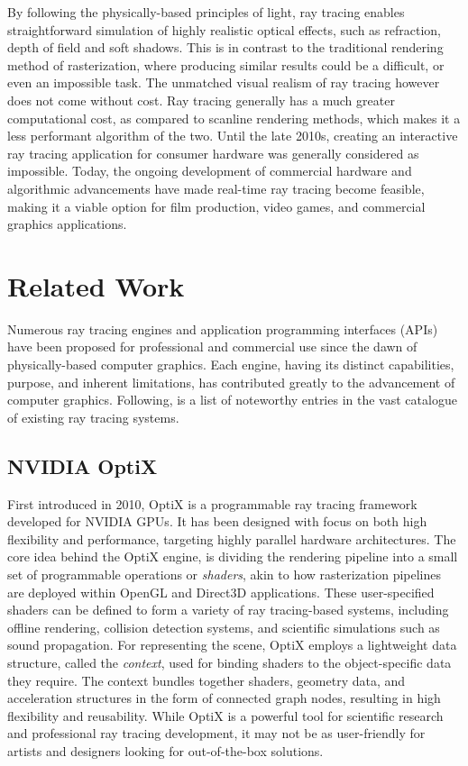 By following the physically-based principles of light, ray tracing enables straightforward simulation of highly realistic optical effects, such as refraction, depth of field and soft shadows.
This is in contrast to the traditional rendering method of rasterization, where producing similar results could be a difficult, or even an impossible task. 
The unmatched visual realism of ray tracing however does not come without cost. 
Ray tracing generally has a much greater computational cost, as compared to scanline rendering methods, which makes it a less performant algorithm of the two.
Until the late 2010s, creating an interactive ray tracing application for consumer hardware was generally considered as impossible.
Today, the ongoing development of commercial hardware and algorithmic advancements have made real-time ray tracing become feasible, making it a viable option for film production, video games, and commercial graphics applications.

\section{Related Work}

Numerous ray tracing engines and application programming interfaces (APIs) have been proposed for professional and commercial use since the dawn of physically-based computer graphics.
Each engine, having its distinct capabilities, purpose, and inherent limitations, has contributed greatly to the advancement of computer graphics. 
Following, is a list of noteworthy entries in the vast catalogue of existing ray tracing systems.

\subsection{NVIDIA OptiX}

First introduced in 2010, OptiX \supercite{Parker2010} is a programmable ray tracing framework developed for NVIDIA GPUs.
It has been designed with focus on both high flexibility and performance, targeting highly parallel hardware architectures.
The core idea behind the OptiX engine, is dividing the rendering pipeline into a small set of programmable operations or \textit{shaders}, akin to how rasterization pipelines are deployed within OpenGL and Direct3D applications.
These user-specified shaders can be defined to form a variety of ray tracing-based systems, including offline rendering, collision detection systems, and scientific simulations such as sound propagation.
For representing the scene, OptiX employs a lightweight data structure, called the \textit{context}, used for binding shaders to the object-specific data they require.
The context bundles together shaders, geometry data, and acceleration structures in the form of connected graph nodes, resulting in high flexibility and reusability.
While OptiX is a powerful tool for scientific research and professional ray tracing development, it may not be as user-friendly for artists and designers looking for out-of-the-box solutions.

